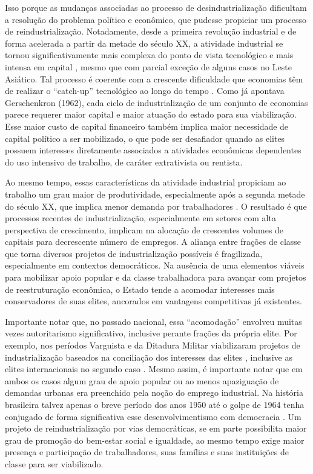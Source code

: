 Isso porque as mudanças associadas ao processo de desindustrialização
dificultam a resolução do problema político e econômico, que pudesse
propiciar um processo de reindustrialização. Notadamente, desde a
primeira revolução industrial e de forma acelerada a partir da metade do
século XX, a atividade industrial se tornou significativamente mais
complexa do ponto de vista tecnológico e mais intensa em capital
\citep{kollmeyer_explaining_2009,rowthorn_growth_1999}, mesmo que com parcial
exceção de alguns casos no Leste Asiático. Tal processo é coerente com a
crescente dificuldade que economias têm de realizar o ``catch-up''
tecnológico ao longo do tempo . Como já apontava
Gerschenkron (1962), cada ciclo de industrialização de um conjunto de
economias parece requerer maior capital e maior atuação do estado para
sua viabilização. Esse maior custo de capital financeiro também implica
maior necessidade de capital político a ser mobilizado, o que pode ser
desafiador quando as elites possuem interesses diretamente associados a
atividades econômicas dependentes do uso intensivo de trabalho, de
caráter extrativista ou rentista.

Ao mesmo tempo, essas características da atividade industrial propiciam
ao trabalho um grau maior de produtividade, especialmente após a segunda
metade do século XX, que implica menor demanda por trabalhadores
\citep{kollmeyer_explaining_2009,rowthorn_growth_1999}. O resultado é que
processos recentes de industrialização, especialmente em setores com
alta perspectiva de crescimento, implicam na alocação de crescentes
volumes de capitais para decrescente número de empregos. A aliança entre
frações de classe que torna diversos projetos de industrialização
possíveis é fragilizada, especialmente em contextos democráticos. Na
ausência de uma elementos viáveis para mobilizar apoio popular e da
classe trabalhadora para avançar com projetos de reestruturação
econômica, o Estado tende a acomodar interesses mais conservadores de
suas elites, ancorados em vantagens competitivas já existentes.

Importante notar que, no passado nacional, essa ``acomodação'' envolveu
muitas vezes autoritarismo significativo, inclusive perante frações da
própria elite. Por exemplo, nos períodos Varguista e da Ditadura Militar
viabilizaram projetos de industrialização baseados na conciliação dos
interesses das elites \citep{perissinotto_ideias_2023}, inclusive as elites
internacionais no segundo caso \citep{evans_dependent_1979}. Mesmo assim, é importante
notar que em ambos os casos algum grau de apoio popular ou ao menos
apaziguação de demandas urbanas era preenchido pela noção do emprego
industrial. Na história brasileira talvez apenas o breve período dos
anos 1950 até o golpe de 1964 tenha conjugado de forma significativa
esse desenvolvimentismo com democracia \citep{barbosa_developmentalist_2020}. Um projeto de
reindustrialização por vias democráticas, se em parte possibilita maior
grau de promoção do bem-estar social e igualdade, ao mesmo tempo exige
maior presença e participação de trabalhadores, suas famílias e suas
instituições de classe para ser viabilizado.

